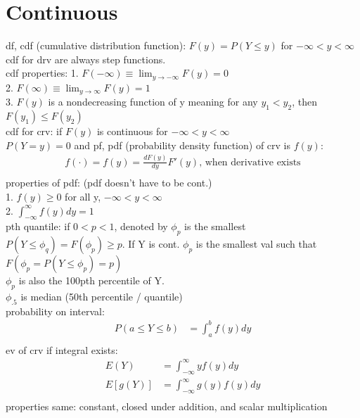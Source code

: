 \documentclass[12pt]{article}
\begin{document}
\section{Continuous}
	df, cdf (cumulative distribution function): $ F(y) = P(Y \le y)$ for 
	$ -\infty < y < \infty $\\
	cdf for drv are always step functions. \\
	cdf properties:
	1. $ F(-\infty ) \equiv \lim_{y \to -\infty } F(y) = 0 $ \\
	2. $ F(\infty) \equiv \lim_{y \to \infty} F(y) = 1 $ \\
	3. $ F(y) $ is a nondecreasing function of y meaning for any 
	$ y_1 < y_2 $, then $ F(y_1) \le F(y_2) $ \\
	cdf for crv: if $ F(y) $ is continuous for $ -\infty < y < \infty $ \\
	$ P(Y=y) = 0 $ and pf, pdf (probability density function) of crv is $ f(y) $:
	\begin{align*}
		f(\cdot)= f(y) = \frac{dF(y)}{dy} F'(y) \text{, when derivative exists}\\
	\end{align*}
	properties of pdf: (pdf doesn't have to be cont.)\\
	1. $ f(y) \ge 0 $ for all y, $ -\infty < y < \infty $ \\
	2. $ \int_{-\infty }^{\infty} f(y) dy = 1 $ \\
	pth quantile: if $ 0 < p < 1 $, denoted by $ \phi_p $ is the smallest
	$ P(Y \le \phi_q) = F(\phi_p) \ge p $. If Y is cont. $ \phi_p $ is the
	smallest val such that $ F(\phi_p	 = P(Y \le \phi_p) = p) $ \\
	$ \phi_p $ is also the 100pth percentile of Y. \\
	$ \phi_{.5} $ is median (50th percentile / quantile) \\
	probability on interval:
	\begin{align*}
		P(a\le Y \le b) &= \int_a^b f(y) dy \\
	\end{align*}
	ev of crv if integral exists:
	\begin{align*}
		E(Y) &= \int_{-\infty }^{\infty} y f(y) dy \\
		E[g(Y)] &= \int_{-\infty }^{\infty} g(y) f(y) dy \\
	\end{align*}
	properties same: constant, closed under addition, and scalar multiplication 
\end{document}
